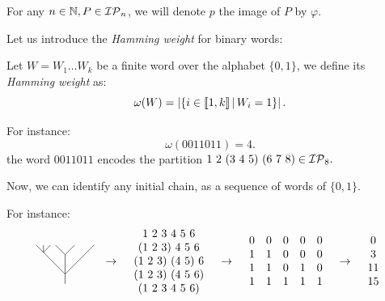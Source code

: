 \begin{Not}
	For any $n\in\mathbb{N},P\in\mathcal{IP}_{n}$, we will denote $p$ the image of $P$ by $\varphi$.
\end{Not}

Let us introduce the \emph{Hamming weight} for binary words:
\begin{defi}
	Let $W=W_1\dots W_k$ be a finite word over the alphabet $\{0,1\}$, we define its \emph{Hamming weight} as:
	\[
	\omega(W)=\left|\{ i\in\llbracket 1,k \rrbracket \,|\, W_i=1\}\right|.
	\]
\end{defi}
\begin{Eg}
	For instance:
	\[
	\omega(0011011)=4.
	\]
	the word $0011011$ encodes the partition $1~2~(3~4~5)~(6~7~8)\in\mathcal{IP}_{8}.$
\end{Eg}

Now, we can identify any initial chain, as a sequence of words of $\{0,1\}$. 
\begin{Eg}\label{Eg:tree_code}
	For instance:
	\begin{align}
		\raisebox{-0.5\height}{\begin{tikzpicture}[x=0.3cm, y=0.3cm]
			\draw (0,0)--(0,1);
			\draw (0,1)--(-3,4);
			\draw (0,1)--(3,4);
			\draw (0,1)--(0,3);
			\draw (0,3)--(-1,4);
			\draw (0,3)--(1,4);
			\draw (-2.25,3.25)--(-2.25,4);
			\draw (-2.25,3.25)--(-1.5,4);
		\end{tikzpicture}} && \rightarrow && \begin{array}{c}
		1~2~3~4~5~6 \\
		(1~2~3)~4~5~6 \\
		(1~2~3)~(4~5)~6 \\
		(1~2~3)~(4~5~6) \\
		(1~2~3~4~5~6)
		\end{array}
		 && \rightarrow &&  \begin{array}{ccccc}
		0 & 0 & 0 & 0 & 0 \\
		1 & 1 & 0 & 0 & 0 \\
		1 & 1 & 0 & 1 & 0 \\
		1 & 1 & 1 & 1 & 1
	\end{array} && \rightarrow && \begin{array}{c}
	0 \\ 3 \\ 11 \\ 15
	\end{array}
	\end{align}
\end{Eg}

